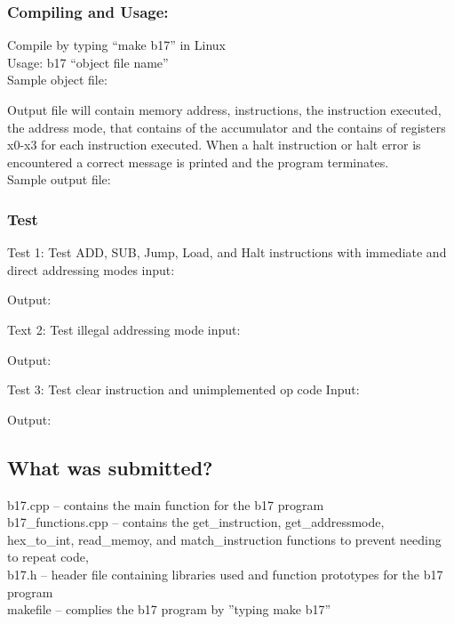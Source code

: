 \documentclass[11pt]{article}
\begin{document}
\subsubsection{Compiling and Usage:}
Compile by typing “make b17” in Linux\\
Usage: b17 “object file name”\\
Sample object file:

Output file will contain memory address, instructions, the instruction executed, the address mode, that contains of the accumulator and the contains of registers x0-x3 for each instruction executed. When a halt instruction or halt error is encountered a correct message is printed and the program terminates. \\
Sample output file:


\subsubsection{Test}
Test 1: Test  ADD, SUB, Jump, Load, and Halt instructions with immediate and direct addressing modes
input:

Output:

Text 2: Test illegal addressing mode
input:

Output:

Test 3: Test clear instruction and unimplemented op code
Input:

Output:


\subsection{What was submitted?}
b17.cpp – contains the main function for the b17 program\\
b17\_functions.cpp – contains the get\_instruction, get\_addressmode, hex\_to\_int, read\_memoy, and match\_instruction functions to prevent needing to repeat code,\\
b17.h – header file containing libraries used and function prototypes for the b17 program\\
makefile – complies the b17 program by ''typing make b17''
\end{document}

